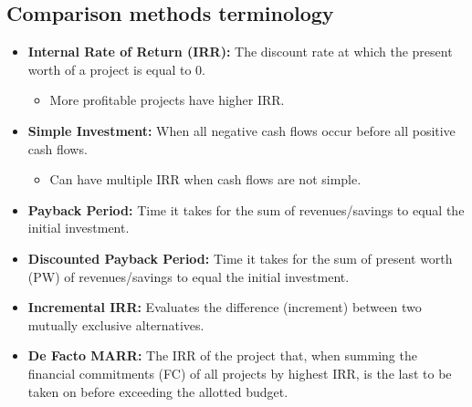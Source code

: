 \subsection{Comparison methods terminology}
\begin{terminology}
    \begin{itemize}
        \item \textbf{Internal Rate of Return (IRR):} The discount rate at which the present worth of a project is equal to 0.
            \begin{itemize}
                \item More profitable projects have higher IRR.
            \end{itemize}
        
        \item \textbf{Simple Investment:} When all negative cash flows occur before all positive cash flows.
            \begin{itemize}
                \item Can have multiple IRR when cash flows are not simple.
            \end{itemize}
        
        \item \textbf{Payback Period:} Time it takes for the sum of revenues/savings to equal the initial investment.
        
        \item \textbf{Discounted Payback Period:} Time it takes for the sum of present worth (PW) of revenues/savings to equal the initial investment.
        
        \item \textbf{Incremental IRR:} Evaluates the difference (increment) between two mutually exclusive alternatives.
        
        \item \textbf{De Facto MARR:} The IRR of the project that, when summing the financial commitments (FC) of all projects by highest IRR, is the last to be taken on before exceeding the allotted budget.
    
    \end{itemize}
\end{terminology}

